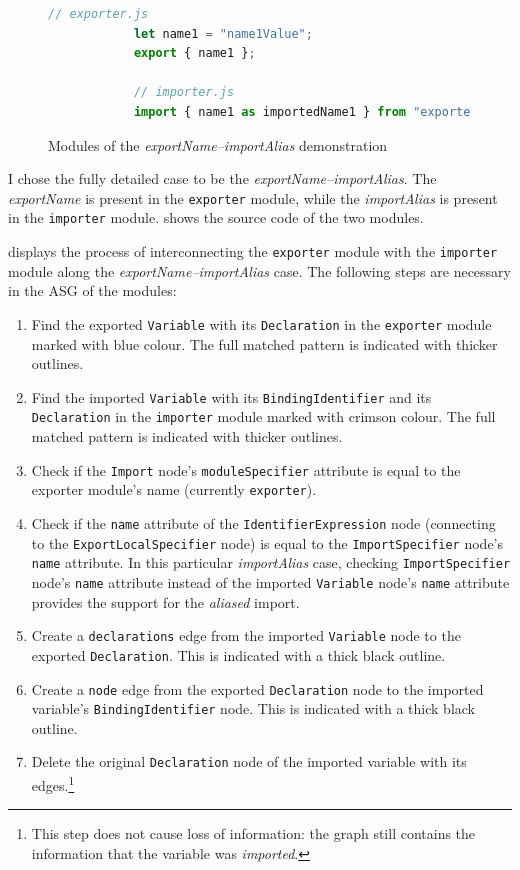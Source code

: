 \begin{figure}[!htb]
	\begin{lstlisting}[language=JavaScript]
			// exporter.js
			let name1 = "name1Value";
			export { name1 };

			// importer.js
			import { name1 as importedName1 } from "exporter";
	\end{lstlisting}
  \caption{Modules of the \emph{exportName–importAlias} demonstration}
  \label{fig:export-import-example-source}
\end{figure}

I chose the fully detailed case to be the \emph{exportName–importAlias}. The \emph{exportName} is present in the \lstinline{exporter} module, while the \emph{importAlias} is present in the \lstinline{importer} module.  shows the source code of the two modules.

 displays the process of interconnecting the \lstinline{exporter} module with the \lstinline{importer} module along the \emph{exportName–importAlias} case. The following steps are necessary in the ASG of the modules:
\begin{enumerate}
\item Find the exported \lstinline{Variable} with its \lstinline{Declaration} in the \lstinline{exporter} module marked with blue colour. The full matched pattern is indicated with thicker outlines.
\item Find the imported \lstinline{Variable} with its \lstinline{BindingIdentifier} and its \lstinline{Declaration} in the \lstinline{importer} module marked with crimson colour. The full matched pattern is indicated with thicker outlines.
\item Check if the \lstinline{Import} node's \lstinline{moduleSpecifier} attribute is equal to the exporter module's name (currently \lstinline{exporter}).
\item Check if the \lstinline{name} attribute of the \lstinline{IdentifierExpression} node (connecting to the \lstinline{ExportLocalSpecifier} node) is equal to the \lstinline{ImportSpecifier} node's \lstinline{name} attribute. In this particular \emph{importAlias} case, checking \lstinline{ImportSpecifier} node's \lstinline{name} attribute instead of the imported \lstinline{Variable} node's \lstinline{name} attribute provides the support for the \emph{aliased} import.
\item Create a \lstinline{declarations} edge from the imported \lstinline{Variable} node to the exported \lstinline{Declaration}. This is indicated with a thick black outline.
\item Create a \lstinline{node} edge from the exported \lstinline{Declaration} node to the imported variable's \lstinline{BindingIdentifier} node. This is indicated with a thick black outline.
\item Delete the original \lstinline{Declaration} node of the imported variable with its edges.\footnote{This step does not cause loss of information: the graph still contains the information that the variable was \emph{imported}.}
\end{enumerate}

